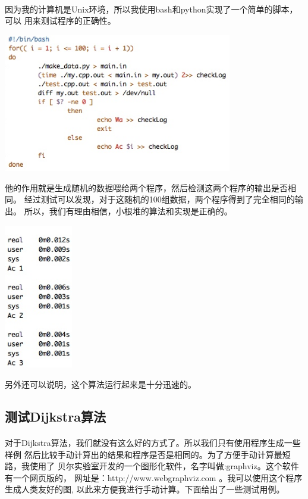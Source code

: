 \documentclass{article}
\begin{document}
		\paragraph{}
			因为我的计算机是Unix环境，所以我使用bash和python实现了一个简单的脚本，可以
			用来测试程序的正确性。
			\begin{center}
			\includegraphics[width = 10cm]{check.jpeg}\\
			\end{center}
			他的作用就是生成随机的数据喂给两个程序，然后检测这两个程序的输出是否相同。
			经过测试可以发现，对于这随机的100组数据，两个程序得到了完全相同的输出。
			所以，我们有理由相信，小根堆的算法和实现是正确的。
			\begin{center}
			\includegraphics[width = 3cm]{log.jpeg}\\
			\end{center}
			另外还可以说明，这个算法运行起来是十分迅速的。
	\subsection{测试Dijkstra算法}
		\paragraph{}
			对于Dijkstra算法，我们就没有这么好的方式了。所以我们只有使用程序生成一些样例
			然后比较手动计算出的结果和程序是否是相同的。为了方便手动计算最短路，我使用了
			贝尔实验室开发的一个图形化软件，名字叫做:graphviz。这个软件有一个网页版的，
			网址是：http://www.webgraphviz.com 。我可以使用这个程序生成人类友好的图,
			以此来方便我进行手动计算。下面给出了一些测试用例。
\end{document}
